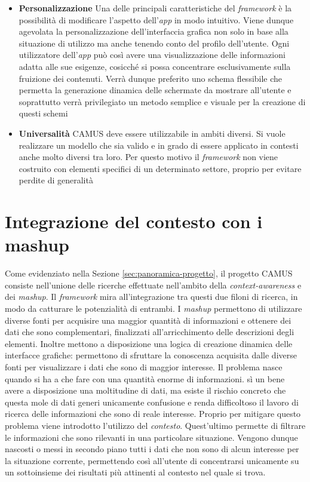 \begin{itemize}
	\item \textbf{Personalizzazione}
	Una delle principali caratteristiche del \emph{framework} è la possibilità di modificare l'aspetto dell'\emph{app} in modo intuitivo. Viene dunque agevolata la personalizzazione dell'interfaccia grafica non solo in base alla situazione di utilizzo ma anche tenendo conto del profilo dell'utente. Ogni utilizzatore dell'\emph{app} può così avere una visualizzazione delle informazioni adatta alle sue esigenze, cosicché si possa concentrare esclusivamente sulla fruizione dei contenuti. Verrà dunque preferito uno schema flessibile che permetta la generazione dinamica delle schermate da mostrare all'utente e soprattutto verrà privilegiato un metodo semplice e visuale per la creazione di questi schemi
	\item \textbf{Universalità}
	CAMUS deve essere utilizzabile in ambiti diversi. Si vuole realizzare un modello che sia valido e in grado di essere applicato in contesti anche molto diversi tra loro. Per questo motivo il \emph{framework} non viene costruito con elementi specifici di un determinato settore, proprio per evitare perdite di generalità
\end{itemize}

\section{Integrazione del contesto con i mashup\label{sec:integrazione-contesto-mashup}}

Come evidenziato nella Sezione \ref{sec:panoramica-progetto}, il progetto CAMUS consiste nell'unione delle ricerche effettuate nell'ambito della \emph{context-awareness} e dei \emph{mashup}. Il \emph{framework} mira all'integrazione tra questi due filoni di ricerca, in modo da catturare le potenzialità di entrambi. I \emph{mashup} permettono di utilizzare diverse fonti per acquisire una maggior quantità di informazioni e ottenere dei dati che sono complementari, finalizzati all'arricchimento delle descrizioni degli elementi. Inoltre mettono a disposizione una logica di creazione dinamica delle interfacce grafiche: permettono di sfruttare la conoscenza acquisita dalle diverse fonti per visualizzare i dati che sono di maggior interesse. Il problema nasce quando si ha a che fare con una quantità enorme di informazioni. \upe sì un bene avere a disposizione una moltitudine di dati, ma esiste il rischio concreto che questa mole di dati generi unicamente confusione e renda difficoltoso il lavoro di ricerca delle informazioni che sono di reale interesse. Proprio per mitigare questo problema viene introdotto l'utilizzo del \emph{contesto}. Quest'ultimo permette di filtrare le informazioni che sono rilevanti in una particolare situazione. Vengono dunque nascosti o messi in secondo piano tutti i dati che non sono di alcun interesse per la situazione corrente, permettendo così all'utente di concentrarsi unicamente su un sottoinsieme dei risultati più attinenti al contesto nel quale si trova.

